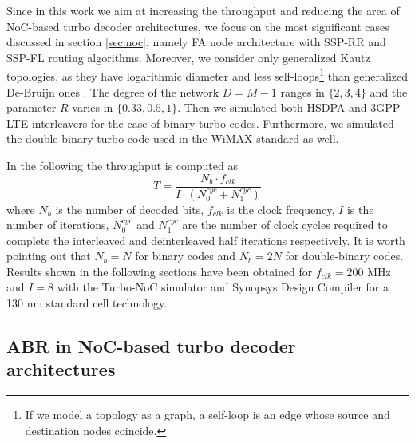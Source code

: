 \documentclass[10pt,twocolumn,journal]{IEEEtran}
\begin{document}
Since in this work we aim at increasing the throughput and reducing the area of NoC-based turbo decoder 
architectures, we focus on the most significant cases discussed in section \ref{sec:noc}, namely FA node 
architecture with SSP-RR and SSP-FL routing algorithms. Moreover, we consider only 
generalized Kautz topologies, as they have logarithmic diameter and less self-loops\footnote{If we model a
topology as a graph, a self-loop is an edge whose source and destination nodes coincide.} than 
generalized De-Bruijn ones \cite{imase_TC81, imase_TC83, martina_TCASI10}. The degree of the network $D=M-1$ ranges in $\{2, 3, 4\}$ and the parameter $R$ varies in 
$\{ 0.33, 0.5, 1\}$. Then we simulated both HSDPA and 3GPP-LTE interleavers for the case of binary turbo 
codes. Furthermore, we simulated the double-binary turbo code used in the WiMAX standard as well.

In the following the throughput is computed as
\begin{equation}
T = \frac{N_b \cdot f_{clk}}{I\cdot(N^{cyc}_0+N^{cyc}_1)}
\label{eq:throughput}
\end{equation}
where $N_b$ is the number of decoded bits, $f_{clk}$ is the clock frequency, $I$ is the number of iterations, 
$N^{cyc}_0$ and $N^{cyc}_1$ are the number of clock cycles required to complete the interleaved 
and deinterleaved half iterations respectively. It is worth pointing out that $N_b=N$ for binary codes and $N_b=2N$ 
for double-binary codes. Results shown in the following sections have been obtained for $f_{clk}=200$ MHz and 
$I=8$ with the Turbo-NoC simulator \cite{turbo_NOC_download} and Synopsys Design Compiler 
for a 130 nm standard cell technology.

\subsection{ABR in NoC-based turbo decoder architectures}
\label{subsec:abr}
\end{document}
